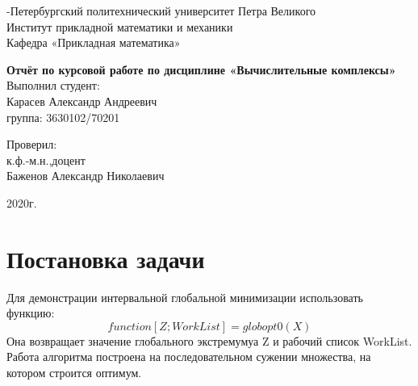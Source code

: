 \documentclass[a4paper]{article}
\begin{document}

\begin{titlepage}
	\clearpage\thispagestyle{empty}
	\centering
	\vspace{1cm}

	{-Петербургский политехнический университет Петра Великого\\
        Институт прикладной математики и механики\\
        Кафедра «Прикладная математика»
    \par}
    
	\vspace{4cm}
	{\huge \textbf{Отчёт по курсовой работе по дисциплине «Вычислительные комплексы»}} \\

	\vspace{4cm}
	{\hfill{} Выполнил студент:\\
	\hfill{}Карасев Александр Андреевич\\
	\hfill{}группа: 3630102/70201}\vspace{2cm}
	
    {\hfill{} Проверил:\\
	\hfill{}к.ф.-м.н.,доцент\\
	\hfill{}Баженов Александр Николаевич}
	
	
	\vspace{2cm}

	{\normalsize 2020г. \par}
	
	\pagebreak

\end{titlepage}

\tableofcontents
\pagebreak

\section{Постановка задачи}
Для демонстрации интервальной глобальной минимизации использовать функцию:
\begin{equation}
function[Z;WorkList] = globopt0(X)    
\end{equation}
Она возвращает значение глобального экстремумуа Z и рабочий список WorkList. Работа алгоритма построена на последовательном сужении множества, на котором строится оптимум.
\end{document}
